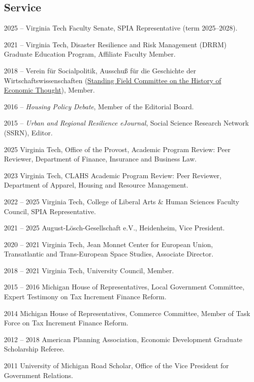 \documentclass[letter,11pt]{article}
\newlength{\cvlabelw}
\newenvironment{cvlist}[1][2.5cm]{%
  \setlength{\cvlabelw}{#1}%
  \begin{list}{}{%
    \setlength{\leftmargin}{\cvlabelw}\setlength{\labelwidth}{\cvlabelw}%
    \setlength{\labelsep}{0pt}\setlength{\itemindent}{0pt}\setlength{\listparindent}{0pt}%
    \setlength{\itemsep}{4pt}\setlength{\parsep}{0pt}\setlength{\topsep}{3pt}\setlength{\partopsep}{0pt}%
    \renewcommand{\makelabel}[1]{##1\hfil}}}{\end{list}}
\begin{document}
\subsection*{Service}
\begin{cvlist}
\item[2025 --] Virginia Tech Faculty Senate, SPIA Representative (term 2025--2028).
\item[2021 --] Virginia Tech, Disaster Resilience and Risk Management (DRRM) Graduate Education Program, Affiliate Faculty Member.
\item[2018 --] Verein f\"{u}r Socialpolitik, Ausschu{\ss} f\"{u}r die Geschichte der Wirtschaftswissenschaften (\href{https://history-economicthought.committee.socialpolitik.de/}{Standing Field Committee on the History of Economic Thought}), Member.
\item[2016 --] \emph{Housing Policy Debate}, Member of the Editorial Board.
\item[2015 --] \emph{Urban and Regional Resilience eJournal}, Social Science Research Network (SSRN), Editor.
\item[2025] Virginia Tech, Office of the Provost, Academic Program Review: Peer Reviewer, Department of Finance, Insurance and Business Law.
\item[2023] Virginia Tech, CLAHS Academic Program Review: Peer Reviewer, Department of Apparel, Housing and Resource Management.
\item[2022 -- 2025] Virginia Tech, College of Liberal Arts \& Human Sciences Faculty Council, SPIA Representative.
\item[2021 -- 2025] August-L\"{o}sch-Gesellschaft e.V., Heidenheim, Vice President.
\item[2020 -- 2021] Virginia Tech, Jean Monnet Center for European Union, Transatlantic and Trans-European Space Studies, Associate Director.
\item[2018 -- 2021] Virginia Tech, University Council, Member.
\item[2015 -- 2016] Michigan House of Representatives, Local Government Committee, Expert Testimony on Tax Increment Finance Reform.
\item[2014] Michigan House of Representatives, Commerce Committee, Member of Task Force on Tax Increment Finance Reform.
\item[2012 -- 2018] American Planning Association, Economic Development Graduate Scholarship Referee.
\item[2011] University of Michigan Road Scholar, Office of the Vice President for Government Relations.
\end{cvlist}
\end{document}

